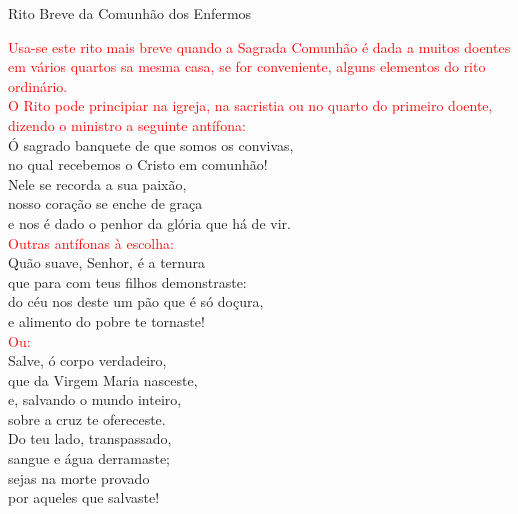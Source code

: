 \documentclass{book}
\begin{document}
\pagestyle{empty}
\begin{center}
    \large Rito Breve da Comunhão dos Enfermos
\end{center}
\begin{flushleft}
    \textcolor{red}{Usa-se este rito mais breve quando a Sagrada Comunhão é dada a muitos doentes em vários quartos sa mesma casa, se for conveniente, alguns elementos do rito ordinário.}
    \vspace{.1cm} \\
    \textcolor{red}{O Rito pode principiar na igreja, na sacristia ou no quarto do primeiro doente, dizendo o ministro a seguinte antífona:}
    \vspace{.1cm} \\
    Ó sagrado banquete de que somos os convivas, \\
    no qual recebemos o Cristo em comunhão! \\
    Nele se recorda a sua paixão, \\
    nosso coração se enche de graça \\
    e nos é dado o penhor da glória que há de vir.
    \vspace{.1cm} \\
    \textcolor{red}{Outras antífonas à escolha:}
    \vspace{.1cm} \\
    Quão suave, Senhor, é a ternura \\
    que para com teus filhos demonstraste: \\
    do céu nos deste um pão que é só doçura, \\
    e alimento do pobre te tornaste!
    \vspace{.1cm} \\
    \textcolor{red}{Ou:}
    \vspace{.1cm} \\
    Salve, ó corpo verdadeiro, \\
    que da Virgem Maria nasceste, \\
    e, salvando o mundo inteiro, \\
    sobre a cruz te ofereceste.
    \vspace{.1cm} \\
    Do teu lado, transpassado, \\
    sangue e água derramaste; \\
    sejas na morte provado \\
    por aqueles que salvaste!
    \vspace{.1cm} \\

\end{flushleft}
\end{document}
